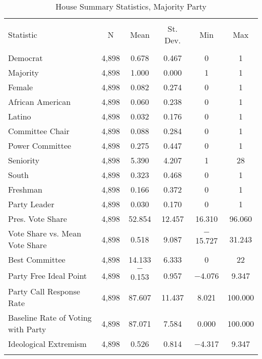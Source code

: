 \documentclass[12pt]{article}
\begin{document}
\begin{table}[!htbp] \centering 
	\caption{House Summary Statistics, Majority Party} 
	\label{} 
	\begin{tabular}{@{\extracolsep{5pt}}lccccc} 
		\\[-1.8ex]\hline 
		\hline \\[-1.8ex] 
		Statistic & \multicolumn{1}{c}{N} & \multicolumn{1}{c}{Mean} & \multicolumn{1}{c}{St. Dev.} & \multicolumn{1}{c}{Min} & \multicolumn{1}{c}{Max} \\ 
		\hline \\[-1.8ex]  
		Democrat & 4,898 & 0.678 & 0.467 & 0 & 1 \\ 
		Majority & 4,898 & 1.000 & 0.000 & 1 & 1 \\ 
		Female & 4,898 & 0.082 & 0.274 & 0 & 1 \\ 
		African American & 4,898 & 0.060 & 0.238 & 0 & 1 \\ 
		Latino & 4,898 & 0.032 & 0.176 & 0 & 1 \\  
		Committee Chair & 4,898 & 0.088 & 0.284 & 0 & 1 \\ 
		Power Committee & 4,898 & 0.275 & 0.447 & 0 & 1 \\ 
		Seniority & 4,898 & 5.390 & 4.207 & 1 & 28 \\  
		South & 4,898 & 0.323 & 0.468 & 0 & 1 \\ 
		Freshman & 4,898 & 0.166 & 0.372 & 0 & 1 \\ 
		Party Leader & 4,898 & 0.030 & 0.170 & 0 & 1 \\ 
		Pres. Vote Share & 4,898 & 52.854 & 12.457 & 16.310 & 96.060 \\ 
		Vote Share vs. Mean Vote Share & 4,898 & 0.518 & 9.087 & $-$15.727 & 31.243 \\ 
		Best Committee & 4,898 & 14.133 & 6.333 & 0 & 22 \\ 
		Party Free Ideal Point & 4,898 & $-$0.153 & 0.957 & $-$4.076 & 9.347 \\ 
		Party Call Response Rate & 4,898 & 87.607 & 11.437 & 8.021 & 100.000 \\ 
		Baseline Rate of Voting with Party & 4,898 & 87.071 & 7.584 & 0.000 & 100.000 \\ 
		Ideological Extremism & 4,898 & 0.526 & 0.814 & $-$4.317 & 9.347 \\ 
		\hline \\[-1.8ex] 
	\end{tabular} 
\end{table} 
\end{document}
